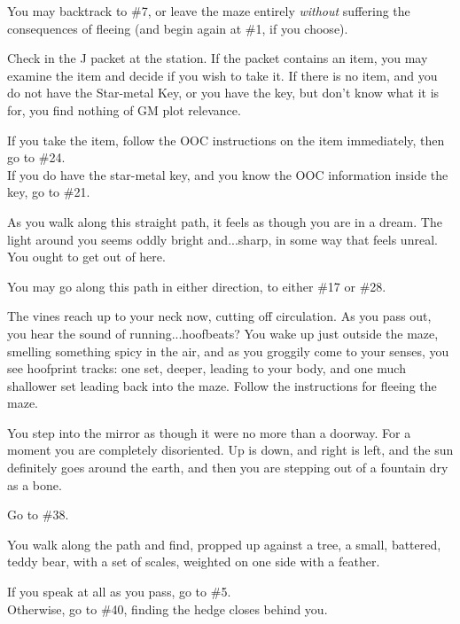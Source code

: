 \documentclass[green]{gl2018}
\begin{document}
\begin{large}
\begin{location}{38}
\begin{fromhere} You may backtrack to \#7, or leave the maze entirely {\em without} suffering the consequences of fleeing (and begin again at \#1, if you choose).
\end{fromhere}
\end{location}
\begin{location}{39}
 Check in the J packet at the station.  If the packet contains an item, you may examine the item and decide if you wish to take it.  If there is no item, and you do not have the Star-metal Key, or you have the key, but don't know what it is for, you find nothing of GM plot relevance. 
\begin{fromhere}
If you take the item, follow the OOC instructions on the item immediately, then go to \#24.\\
If you do have the star-metal key, and you know the OOC information inside the key, go to \#21.
\end{fromhere}
\end{location}
\begin{location}{40}
As you walk along this straight path, it feels as though you are in a dream.  The light around you seems oddly bright and...sharp, in some way that feels unreal.  You ought to get out of here.
\begin{fromhere}
You may go along this path in either direction, to either \#17 or \#28.
\end{fromhere}
\end{location}
\begin{location}{41}
The vines reach up to your neck now, cutting off circulation.  As you pass out, you hear the sound of running...hoofbeats?  You wake up just outside the maze, smelling something spicy in the air, and as you groggily come to your senses, you see hoofprint tracks: one set, deeper, leading to your body, and one much shallower set leading back into the maze.  Follow the instructions for fleeing the maze.
\end{location}
\begin{location}{42}
You step into the mirror as though it were no more than a doorway. For a moment you are completely disoriented. Up is down, and right is left, and the sun definitely goes around the earth, and then you are stepping out of a fountain dry as a bone.

\begin{fromhere}
Go to \#38.\\

\end{fromhere}
\end{location}
\begin{location}{43}
You walk along the path and find, propped up against a tree, a small, battered, teddy bear, with a set of scales, weighted on one side with a feather.
\begin{fromhere}
If you speak at all as you pass, go to \#5.\\
Otherwise, go to \#40, finding the hedge closes behind you.
\end{fromhere}
\end{location}
\begin{location}{44}


\end{location}
\end{large}
\end{document}
